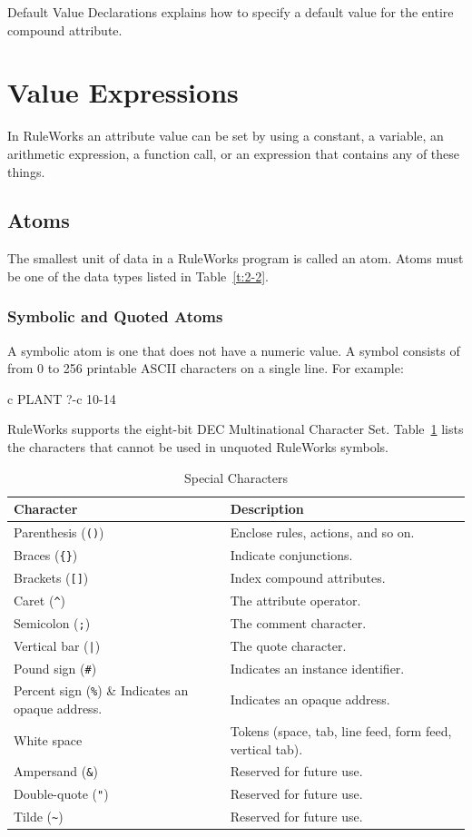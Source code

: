 Default Value Declarations explains how to specify a default value for
the entire compound attribute.

\section{Value Expressions}

In RuleWorks an attribute value can be set by using a constant, a
variable, an arithmetic expression, a function call, or an expression
that contains any of these things.

\subsection{Atoms}

The smallest unit of data in a RuleWorks program is called an
atom. Atoms must be one of the data types listed in Table~\ref{t:2-2}.

\subsubsection{Symbolic and Quoted Atoms}

A symbolic atom is one that does not have a numeric value. A symbol
consists of from 0 to 256 printable ASCII characters on a single
line. For example:
\begin{qv}
c
PLANT
?-c
10-14
\end{qv}
RuleWorks supports the eight-bit DEC Multinational Character
Set. Table~\ref{t:2-3} lists the characters that cannot be used in
unquoted RuleWorks symbols.

\begin{table}[h]
  \centering
  \begin{tabular}{ll}
    \toprule
    Character & Description \\
    \midrule
    Parenthesis (\verb|()|) & Enclose rules, actions, and so on. \\
    Braces (\verb|{}|) & Indicate conjunctions. \\
    Brackets (\verb|[]|) & Index compound attributes. \\
    Caret (\verb|^|) & The attribute operator. \\
    Semicolon (\verb|;|) & The comment character. \\
    Vertical bar (\verb,|,) & The quote character. \\
    Pound sign (\verb|#|)  & Indicates an instance identifier. \\
    Percent sign (\verb|%|) & Indicates an opaque address. \\
    White space & Tokens (space, tab, line feed, form feed, vertical tab). \\
    Ampersand (\verb|&|) & Reserved for future use.  \\
    Double-quote (\verb|"|) & Reserved for future use. \\
    Tilde (\verb|~|) & Reserved for future use. \\
    \bottomrule
  \end{tabular}
  \caption{Special Characters}
  \label{t:2-3}
\end{table}


